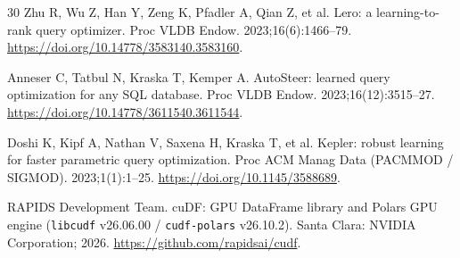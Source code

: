 \documentclass[10pt,a4paper]{article}
\begin{document}
{\begin{thebibliography}{30}
Zhu R, Wu Z, Han Y, Zeng K, Pfadler A, Qian Z, et al. Lero: a learning-to-rank query optimizer. Proc VLDB Endow. 2023;16(6):1466--79. \url{https://doi.org/10.14778/3583140.3583160}.

Anneser C, Tatbul N, Kraska T, Kemper A. AutoSteer: learned query optimization for any SQL database. Proc VLDB Endow. 2023;16(12):3515--27. \url{https://doi.org/10.14778/3611540.3611544}.

Doshi K, Kipf A, Nathan V, Saxena H, Kraska T, et al. Kepler: robust learning for faster parametric query optimization. Proc ACM Manag Data (PACMMOD / SIGMOD). 2023;1(1):1--25. \url{https://doi.org/10.1145/3588689}.


RAPIDS Development Team. cuDF: GPU DataFrame library and Polars GPU engine (\texttt{libcudf} v26.06.00 / \texttt{cudf-polars} v26.10.2). Santa Clara: NVIDIA Corporation; 2026. \url{https://github.com/rapidsai/cudf}.
\end{thebibliography}
}

\end{document}
